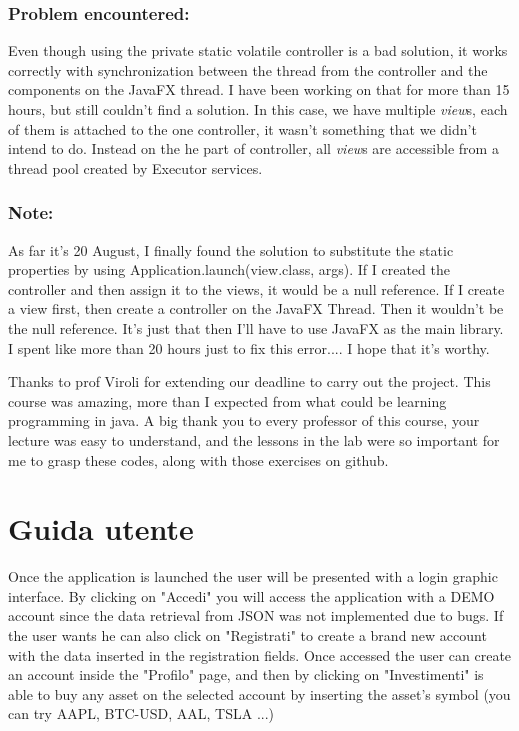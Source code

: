 \documentclass[a4paper,12pt]{report}
\begin{document}
\subsection*{Problem encountered:}

Even though using the private static volatile controller is a bad solution, it works correctly with synchronization between the thread from the controller and the components on the JavaFX thread. 
I have been working on that for more than 15 hours, but still couldn't find a solution. In this case, we have multiple \textit{view}s, each of them is attached to the one controller, it wasn't something that we didn't intend to do.
Instead on the he part of controller, all \textit{view}s are accessible from a thread pool created by Executor services. 

\subsection*{Note:}
As far it's 20 August, I finally found the solution to substitute the static properties by using Application.launch(view.class, args). If I created the controller and then assign it to the views, it would be a null reference. If I create a view first, then create a controller on the JavaFX Thread. Then it wouldn't be the null reference. It's just that then I'll have to use JavaFX as the main library.
I spent like more than 20 hours just to fix this error.... I hope that it's worthy.

Thanks to prof Viroli for extending our deadline to carry out the project.
%
This course was amazing, more than I expected from what could be learning programming in java. 
%
A big thank you to every professor of this course, your lecture was easy to understand, and the lessons in the lab were so important for me to grasp these codes, along with those exercises on github.

\appendix
\chapter{Guida utente}

Once the application is launched the user will be presented with a login graphic interface.
By clicking on "Accedi" you will access the application with a DEMO account since the data retrieval
from JSON was not implemented due to bugs.
If the user wants he can also click on "Registrati" to create a brand new account with the data inserted
in the registration fields.
Once accessed the user can create an account inside the "Profilo" page, and then by clicking on "Investimenti"
is able to buy any asset on the selected account by inserting the asset's symbol (you can try AAPL, BTC-USD, AAL, TSLA ...)
\end{document}
